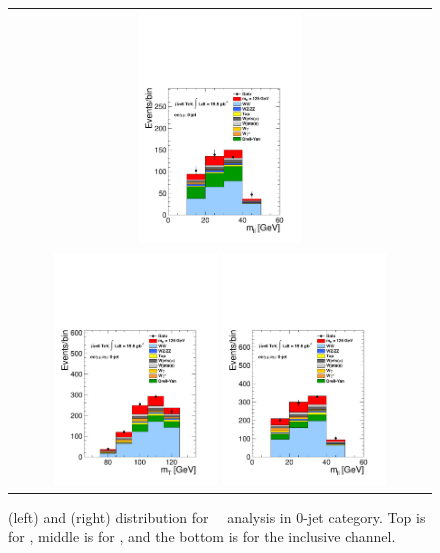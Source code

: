 \begin{figure}[htp]
\begin{tabular}{c}
\includegraphics[width=0.4\textwidth]{figures/hww_analysis17_125_ALL_sf_0j_mll.pdf}
\\
\includegraphics[width=0.4\textwidth]{figures/hww_analysis17_125_ALL_incl_0j_mt.pdf}
\includegraphics[width=0.4\textwidth]{figures/hww_analysis17_125_ALL_incl_0j_mll.pdf}
\end{tabular} 
\caption{ \mT(left) and \mll(right) distribution for ~\GeV\ analysis 
in 0-jet category. 
Top is for \DF, middle is for \SF, and the bottom is for the inclusive channel.}
\label{fig:cutbased125_0jet} 
\end{figure} 
